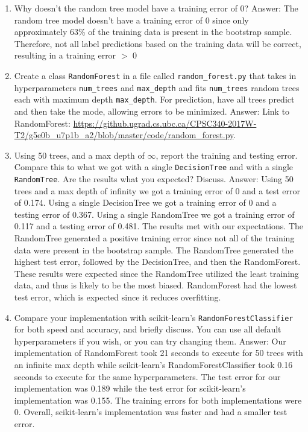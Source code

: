 \documentclass{article}
\def\blu#1{{\color{blu}#1}}
\def\gre#1{{\color{gre}#1}}
\def\enum#1{\begin{enumerate}#1\end{enumerate}}
\begin{document}
\blu{
\enum{
\item Why doesn't the random tree model have a training error of 0?
\newline
\gre{Answer: The random tree model doesn't have a training error of 0 since only approximately 63\% of the training data is present in the bootstrap sample. Therefore, not all label predictions based on the training data will be correct, resulting in a training error $>$ 0}
\item Create a class \texttt{RandomForest} in a file called \texttt{random\string_forest.py} that takes in hyperparameters \texttt{num\string_trees} and \texttt{max\string_depth} and
fits \texttt{num\string_trees} random trees each with maximum depth \texttt{max\string_depth}. For prediction, have all trees predict and then take the mode, allowing errors to be minimized.
\newline
\gre{Answer: Link to RandomForest: \url{https://github.ugrad.cs.ubc.ca/CPSC340-2017W-T2/g5e0b_u7p1b_a2/blob/master/code/random_forest.py}.}
\item Using 50 trees, and a max depth of $\infty$, report the training and testing error. Compare this to what we got with a single \texttt{DecisionTree} and with a single \texttt{RandomTree}. Are the results what you expected? Discuss.
\newline
\gre{Answer: Using 50 trees and a max depth of infinity we got a training error of 0 and a test error of 0.174. Using a single DecisionTree we got a training error of 0 and a testing error of 0.367. Using a single RandomTree we got a training error of 0.117 and a testing error of 0.481. The results met with our expectations. The RandomTree generated a positive training error since not all of the training data were present in the bootstrap sample. The RandomTree generated the highest test error, followed by the DecisionTree, and then the RandomForest. These results were expected since the RandomTree utilized the least training data, and thus is likely to be the most biased. RandomForest had the lowest test error, which is expected since it reduces overfitting.}
\item Compare your implementation with scikit-learn's \texttt{RandomForestClassifier} for both speed and accuracy, and briefly discuss. You can use all default hyperparameters if you wish, or you can try changing them.
\newline
\gre{Answer: Our implementation of RandomForest took 21 seconds to execute for 50 trees with an infinite max depth while scikit-learn’s RandomForestClassifier took 0.16 seconds to execute for the same hyperparameters. The test error for our implementation was 0.189 while the test error for scikit-learn’s implementation was 0.155. The training errors for both implementations were 0. Overall, scikit-learn’s implementation was faster and had a smaller test error.}
}
}
\end{document}
